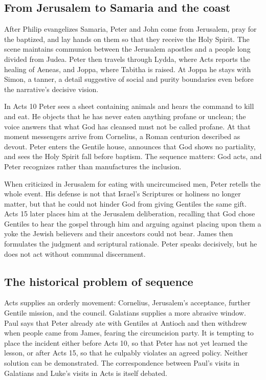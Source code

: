 \subsection{From Jerusalem to Samaria and the coast}

After Philip evangelizes Samaria, Peter and John come from Jerusalem, pray
for the baptized, and lay hands on them so that they receive the Holy Spirit.
The scene maintains communion between the Jerusalem apostles and a people
long divided from Judea. Peter then travels through Lydda, where Acts reports
the healing of Aeneas, and Joppa, where Tabitha is raised. At Joppa he stays
with Simon, a tanner, a detail suggestive of social and purity boundaries even
before the narrative's decisive vision.

In Acts 10 Peter sees a sheet containing animals and hears the command to kill
and eat. He objects that he has never eaten anything profane or unclean; the
voice answers that what God has cleansed must not be called profane. At that
moment messengers arrive from Cornelius, a Roman centurion described as
devout. Peter enters the Gentile house, announces that God shows no
partiality, and sees the Holy Spirit fall before baptism. The sequence matters:
God acts, and Peter recognizes rather than manufactures the inclusion.

When criticized in Jerusalem for eating with uncircumcised men, Peter retells
the whole event. His defense is not that Israel's Scriptures or holiness no
longer matter, but that he could not hinder God from giving Gentiles the same
gift. Acts 15 later places him at the Jerusalem deliberation, recalling that
God chose Gentiles to hear the gospel through him and arguing against placing
upon them a yoke the Jewish believers and their ancestors could not bear.
James then formulates the judgment and scriptural rationale. Peter speaks
decisively, but he does not act without communal discernment.

\subsection{The historical problem of sequence}

Acts supplies an orderly movement: Cornelius, Jerusalem's acceptance, further
Gentile mission, and the council. Galatians supplies a more abrasive window.
Paul says that Peter already ate with Gentiles at Antioch and then withdrew
when people came from James, fearing the circumcision party. It is tempting
to place the incident either before Acts 10, so that Peter has not yet learned
the lesson, or after Acts 15, so that he culpably violates an agreed policy.
Neither solution can be demonstrated. The correspondence between Paul's
visits in Galatians and Luke's visits in Acts is itself debated.

